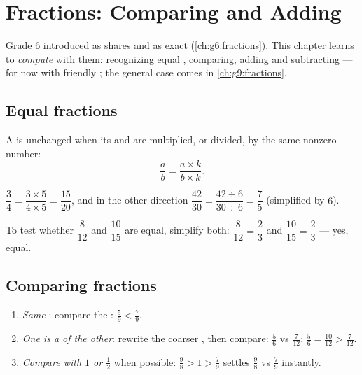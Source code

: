 \chapter{Fractions: Comparing and Adding}\label{ch:g7:fractions}

Grade 6 introduced  as shares and as exact 
(\cref{ch:g6:fractions}). This chapter learns to \emph{compute} with
them: recognizing equal , comparing, adding and subtracting
--- for now with friendly ; the general case comes in
\cref{ch:g9:fractions}.

\section{Equal fractions}

\begin{theorem}\label{thm:g7:fractions:equal}
A  is unchanged when its  and  are
multiplied, or divided, by the same nonzero number:
\[
\frac{a}{b} = \frac{a \times k}{b \times k} .
\]
\end{theorem}
\admitted

\begin{example}\label{ex:g7:fractions:equal}
$\dfrac{3}{4} = \dfrac{3 \times 5}{4 \times 5} = \dfrac{15}{20}$, and
in the other direction $\dfrac{42}{30} = \dfrac{42 \div 6}{30 \div 6}
= \dfrac{7}{5}$ (simplified by $6$).

To test whether $\dfrac{8}{12}$ and $\dfrac{10}{15}$ are equal,
simplify both: $\dfrac{8}{12} = \dfrac{2}{3}$ and
$\dfrac{10}{15} = \dfrac{2}{3}$ --- yes, equal.
\end{example}

\section{Comparing fractions}

\begin{method}\label{met:g7:fractions:compare}
\begin{enumerate}
  \item \emph{Same }: compare the :
        $\frac{5}{9} < \frac{7}{9}$.
  \item \emph{One  is a  of the other}: rewrite the
        coarser , then compare:
        $\frac{5}{6}$ vs $\frac{7}{12}$: $\frac56 = \frac{10}{12} >
        \frac{7}{12}$.
  \item \emph{Compare with $1$ or $\frac12$} when possible:
        $\frac{9}{8} > 1 > \frac{7}{9}$ settles
        $\frac98$ vs $\frac79$ instantly.
\end{enumerate}
\end{method}


